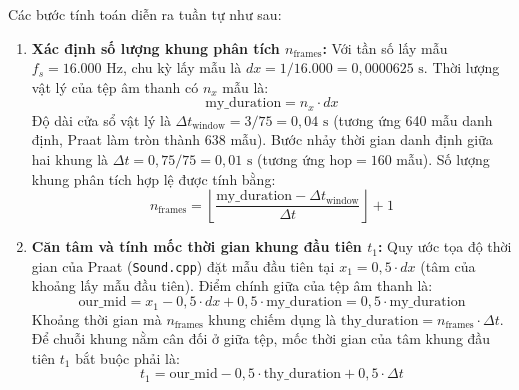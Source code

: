 Các bước tính toán diễn ra tuần tự như sau:
\begin{enumerate}[leftmargin=1.5em, itemsep=3pt]
    \item \textbf{Xác định số lượng khung phân tích $n_{\text{frames}}$:}
    Với tần số lấy mẫu $f_s = 16.000\text{ Hz}$, chu kỳ lấy mẫu là $dx = 1 / 16.000 = 0{,}0000625\text{ s}$. Thời lượng vật lý của tệp âm thanh có $n_x$ mẫu là:
    \begin{equation}
    \text{my\_duration} = n_x \cdot dx
    \end{equation}
    Độ dài cửa sổ vật lý là $\Delta t_{\text{window}} = 3 / 75 = 0{,}04\text{ s}$ (tương ứng 640 mẫu danh định, Praat làm tròn thành 638 mẫu). Bước nhảy thời gian danh định giữa hai khung là $\Delta t = 0{,}75 / 75 = 0{,}01\text{ s}$ (tương ứng $\text{hop} = 160$ mẫu). Số lượng khung phân tích hợp lệ được tính bằng:
    \begin{equation}
    n_{\text{frames}} = \left\lfloor \frac{\text{my\_duration} - \Delta t_{\text{window}}}{\Delta t} \right\rfloor + 1
    \end{equation}
    
    \item \textbf{Căn tâm và tính mốc thời gian khung đầu tiên $t_1$:}
    Quy ước tọa độ thời gian của Praat (\texttt{Sound.cpp}) đặt mẫu đầu tiên tại $x_1 = 0{,}5 \cdot dx$ (tâm của khoảng lấy mẫu đầu tiên). Điểm chính giữa của tệp âm thanh là:
    \begin{equation}
    \text{our\_mid} = x_1 - 0{,}5 \cdot dx + 0{,}5 \cdot \text{my\_duration} = 0{,}5 \cdot \text{my\_duration}
    \end{equation}
    Khoảng thời gian mà $n_{\text{frames}}$ khung chiếm dụng là $\text{thy\_duration} = n_{\text{frames}} \cdot \Delta t$. Để chuỗi khung nằm cân đối ở giữa tệp, mốc thời gian của tâm khung đầu tiên $t_1$ bắt buộc phải là:
    \begin{equation}
    t_1 = \text{our\_mid} - 0{,}5 \cdot \text{thy\_duration} + 0{,}5 \cdot \Delta t
    \end{equation}
    

\end{enumerate}
